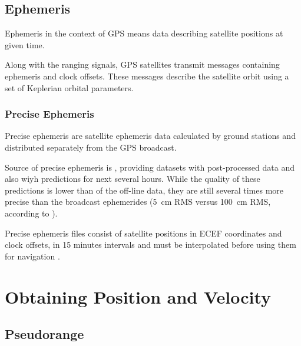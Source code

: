 

\subsection{Ephemeris}
\label{sec:gps-ephemeris}

Ephemeris in the context of GPS means data describing satellite positions
at given time.

Along with the ranging signals, GPS satellites transmit messages containing ephemeris and
clock offsets.
These messages describe the satellite orbit using a set of Keplerian orbital parameters.


\subsubsection{Precise Ephemeris}
Precise ephemeris are satellite ephemeris data calculated by ground stations
and distributed separately from the GPS broadcast.

Source of precise ephemeris is \cite{orbit-data}, providing datasets with
post-processed data and also wiyh predictions for next several hours.
While the quality of these predictions is lower than of the off-line data,
they are still several times more precise than the broadcast ephemerides
(\SI{5}{\centi\meter} RMS versus \SI{100}{\centi\meter} RMS, according to \cite{orbit-data}).

Precise ephemeris files consist of satellite positions in ECEF
coordinates and clock offsets, in 15 minutes intervals and must be interpolated
before using them for navigation \cite{schenewerk03}.

\section{Obtaining Position and Velocity}


\subsection{Pseudorange}
\label{sec:pseudorange}

